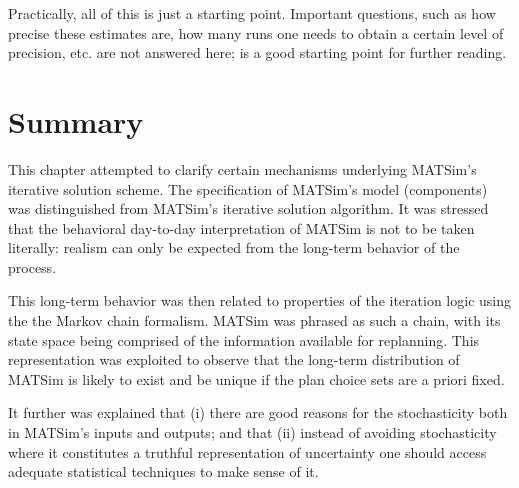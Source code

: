 Practically, all of this is just a starting point. Important questions,
such as how precise these estimates are, how many runs one needs to
obtain a certain level of precision, etc. are not answered here; 
\citet{ross-2006} is a good starting point for further reading. 


\section{\label{sec:Summary}Summary}

This chapter attempted to clarify certain mechanisms underlying MATSim's
iterative solution scheme. The specification of MATSim's model (components)
was distinguished from MATSim's iterative solution algorithm. It was
stressed that the behavioral day-to-day interpretation of MATSim is
not to be taken literally: realism can only be expected from the long-term
behavior of the process.

This long-term behavior was then related to properties of the iteration
logic using the the Markov chain formalism. MATSim was phrased as
such a chain, with its state space being comprised of the information
available for replanning. This representation was exploited to
observe that the long-term distribution of MATSim is likely to exist
and be unique if the plan choice sets are a priori fixed.

It further was explained that (i) there are good reasons for the stochasticity
both in MATSim's inputs and outputs; and that (ii) instead of avoiding
stochasticity where it constitutes a truthful representation of uncertainty
one should access adequate statistical techniques to make sense of
it. 

